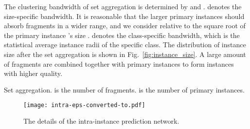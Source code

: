 \documentclass[10pt,twocolumn,letterpaper]{article}
\begin{document}
The clustering bandwidth of set aggregation is determined by  and .
 denotes the size-specific bandwidth.
It is reasonable that the larger primary instances should absorb fragments in a wider range, and we consider  relative to the square root of the primary instance ’s size . 
 denotes the class-specific bandwidth, which is the statistical average instance radii of the specific class.
The distribution of instance size after the set aggregation is shown in Fig.~\ref{fig:instance_size}. A large amount of fragments are combined together with primary instances to form instances with higher quality.


\begin{algorithm}[htb]  
  \caption{Set aggregation.  is the number of fragments.  is the number of primary instances.}  
  \label{alg:set_aggr}  
    
    \Return{}
\end{algorithm}




\begin{figure}[htb]
\centering

\texttt{[image: intra-eps-converted-to.pdf]}
\caption{The details of the intra-instance prediction network.}
\label{fig:intra}

\end{figure}
\end{document}
